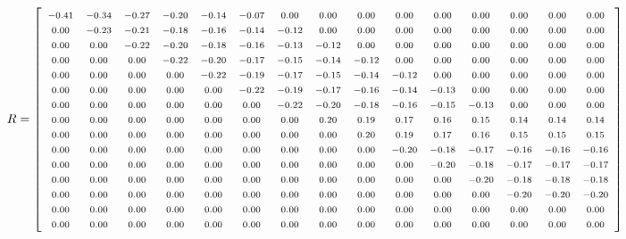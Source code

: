 \documentclass[12pt]{article}
\begin{document}
            \[
                \fontsize{7}{2}
                R=
                \left[
                    \begin{array}{ccccccccccccccc}
                        -0.41 & -0.34 & -0.27 & -0.20 & -0.14 & -0.07 & 0.00 & 0.00 & 0.00 & 0.00 & 0.00 & 0.00 & 0.00 & 0.00 & 0.00\\
                        0.00 & -0.23 & -0.21 & -0.18 & -0.16 & -0.14 & -0.12 & 0.00 & 0.00 & 0.00 & 0.00 & 0.00 & 0.00 & 0.00 & 0.00\\
                        0.00 & 0.00 & -0.22 & -0.20 & -0.18 & -0.16 & -0.13 & -0.12 & 0.00 & 0.00 & 0.00 & 0.00 & 0.00 & 0.00 & 0.00\\
                        0.00 & 0.00 & 0.00 & -0.22 & -0.20 & -0.17 & -0.15 & -0.14 & -0.12 & 0.00 & 0.00 & 0.00 & 0.00 & 0.00 & 0.00\\
                        0.00 & 0.00 & 0.00 & 0.00 & -0.22 & -0.19 & -0.17 & -0.15 & -0.14 & -0.12 & 0.00 & 0.00 & 0.00 & 0.00 & 0.00\\
                        0.00 & 0.00 & 0.00 & 0.00 & 0.00 & -0.22 & -0.19 & -0.17 & -0.16 & -0.14 & -0.13 & 0.00 & 0.00 & 0.00 & 0.00\\
                        0.00 & 0.00 & 0.00 & 0.00 & 0.00 & 0.00 & -0.22 & -0.20 & -0.18 & -0.16 & -0.15 & -0.13 & 0.00 & 0.00 & 0.00\\
                        0.00 & 0.00 & 0.00 & 0.00 & 0.00 & 0.00 & 0.00 & 0.20 & 0.19 & 0.17 & 0.16 & 0.15 & 0.14 & 0.14 & 0.14\\
                        0.00 & 0.00 & 0.00 & 0.00 & 0.00 & 0.00 & 0.00 & 0.00 & 0.20 & 0.19 & 0.17 & 0.16 & 0.15 & 0.15 & 0.15\\
                        0.00 & 0.00 & 0.00 & 0.00 & 0.00 & 0.00 & 0.00 & 0.00 & 0.00 & -0.20 & -0.18 & -0.17 & -0.16 & -0.16 & -0.16\\
                        0.00 & 0.00 & 0.00 & 0.00 & 0.00 & 0.00 & 0.00 & 0.00 & 0.00 & 0.00 & -0.20 & -0.18 & -0.17 & -0.17 & -0.17\\
                        0.00 & 0.00 & 0.00 & 0.00 & 0.00 & 0.00 & 0.00 & 0.00 & 0.00 & 0.00 & 0.00 & -0.20 & -0.18 & -0.18 & -0.18\\
                        0.00 & 0.00 & 0.00 & 0.00 & 0.00 & 0.00 & 0.00 & 0.00 & 0.00 & 0.00 & 0.00 & 0.00 & -0.20 & -0.20 & -0.20\\
                        0.00 & 0.00 & 0.00 & 0.00 & 0.00 & 0.00 & 0.00 & 0.00 & 0.00 & 0.00 & 0.00 & 0.00 & 0.00 & 0.00 & 0.00\\
                        0.00 & 0.00 & 0.00 & 0.00 & 0.00 & 0.00 & 0.00 & 0.00 & 0.00 & 0.00 & 0.00 & 0.00 & 0.00 & 0.00 & 0.00\\                       
                    \end{array}    
                \right]    
            \]
\end{document}
